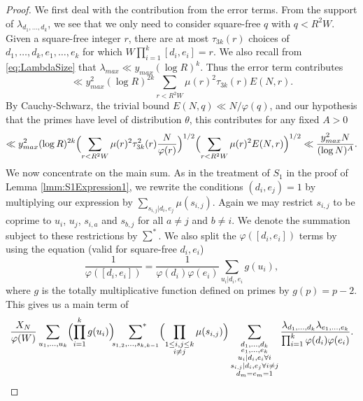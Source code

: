 \documentclass[12pt,a4paper]{amsart}
\theoremstyle{plain}
\numberwithin{sblmm}{thrm}
\numberwithin{equation}{section}
\renewcommand{\phi}{\varphi}
\begin{document}
\begin{proof}
We first deal with the contribution from the error terms. From the support of $\lambda_{d_1,\dotsc,d_k}$, we see that we only need to consider square-free $q$ with $q<R^2W$. Given a square-free integer $r$, there are at most $\tau_{3k}(r)$ choices of $d_1,\dotsc,d_k,e_1,\dotsc, e_k$ for which $W\prod_{i=1}^k[d_i,e_i]=r$. We also recall from \eqref{eq:LambdaSize} that $\lambda_{max}\ll y_{max}(\log{R})^k$. Thus the error term contributes
\begin{equation}
\ll y_{max}^2(\log{R})^{2k}\sum_{r<R^2W}\mu(r)^2\tau_{3k}(r)E(N,r).
\end{equation}
By Cauchy-Schwarz, the trivial bound $E(N,q)\ll N/\phi(q)$, and our hypothesis that the primes have level of distribution $\theta$, this contributes for any fixed $A>0$
\begin{equation}
\ll y_{max}^2(\log{R})^{2k}\Bigl(\sum_{r<R^2W}\mu(r)^2\tau^2_{3k}(r)\frac{N}{\phi(r)}\Bigr)^{1/2}\Bigl(\sum_{r<R^2W}\mu(r)^2E(N,r)\Bigr)^{1/2}\ll \frac{y_{max}^2N}{(\log{N})^A}.
\end{equation}
We now concentrate on the main sum. As in the treatment of $S_1$ in the proof of Lemma \ref{lmm:S1Expression1}, we rewrite the conditions $(d_{i},e_{j})=1$ by multiplying our expression by $\sum_{s_{i,j}|d_i,e_j}\mu(s_{i,j})$. Again we may restrict $s_{i,j}$ to be coprime to $u_i$, $u_j$, $s_{i,a}$ and $s_{b,j}$ for all $a\ne j$ and $b\ne i$. We denote the summation subject to these restrictions by $\sum^*$. We also split the $\phi([d_i,e_i])$ terms by using the equation (valid for square-free $d_i,e_i$)
\begin{equation}
\frac{1}{\phi([d_i,e_i])}=\frac{1}{\phi(d_i)\phi(e_i)}\sum_{u_i|d_i,e_i}g(u_i),
\end{equation}
where $g$ is the totally multiplicative function defined on primes by $g(p)=p-2$. This gives us
a main term of
\begin{equation}
\frac{X_N}{\phi(W)}\sum_{u_1,\dotsc,u_k}\Bigl(\prod_{i=1}^k g(u_i)\Bigr)\sideset{}{^*}\sum_{s_{1,2},\dotsc, s_{k,k-1}}\Bigl(\prod_{\substack{1\le i,j\le k\\ i\ne j}}\mu(s_{i,j})\Bigr)\sum_{\substack{d_1,\dotsc,d_k\\e_1,\dotsc,e_k\\ u_i|d_i,e_i\forall i\\ s_{i,j}|d_{i},e_{j}\forall i\ne j\\ d_m=e_m=1}}\frac{\lambda_{d_1,\dotsc,d_k}\lambda_{e_1,\dotsc,e_k}}{\prod_{i=1}^k\phi(d_i)\phi(e_i)}.\label{eq:S2MainTerm}
\end{equation}

\end{proof}
\end{document}
